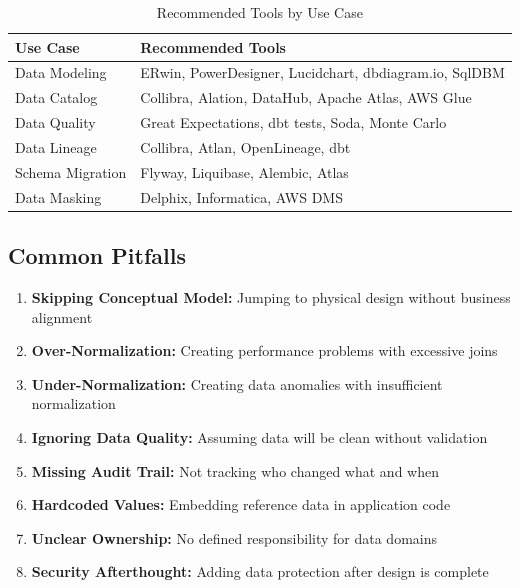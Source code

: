 \documentclass[11pt,letterpaper]{article}
\begin{document}
\begin{table}[H]
\centering
\caption{Recommended Tools by Use Case}
\small
\begin{tabular}{@{}L{3.5cm}L{10cm}@{}}
\toprule
\textbf{Use Case} & \textbf{Recommended Tools} \\
\midrule
Data Modeling & ERwin, PowerDesigner, Lucidchart, dbdiagram.io, SqlDBM \\
Data Catalog & Collibra, Alation, DataHub, Apache Atlas, AWS Glue \\
Data Quality & Great Expectations, dbt tests, Soda, Monte Carlo \\
Data Lineage & Collibra, Atlan, OpenLineage, dbt \\
Schema Migration & Flyway, Liquibase, Alembic, Atlas \\
Data Masking & Delphix, Informatica, AWS DMS \\
\bottomrule
\end{tabular}
\end{table}

\subsection{Common Pitfalls}

\begin{warningbox}
\begin{enumerate}[nosep]
    \item \textbf{Skipping Conceptual Model:} Jumping to physical design without business alignment
    \item \textbf{Over-Normalization:} Creating performance problems with excessive joins
    \item \textbf{Under-Normalization:} Creating data anomalies with insufficient normalization
    \item \textbf{Ignoring Data Quality:} Assuming data will be clean without validation
    \item \textbf{Missing Audit Trail:} Not tracking who changed what and when
    \item \textbf{Hardcoded Values:} Embedding reference data in application code
    \item \textbf{Unclear Ownership:} No defined responsibility for data domains
    \item \textbf{Security Afterthought:} Adding data protection after design is complete
\end{enumerate}
\end{warningbox}
\end{document}
